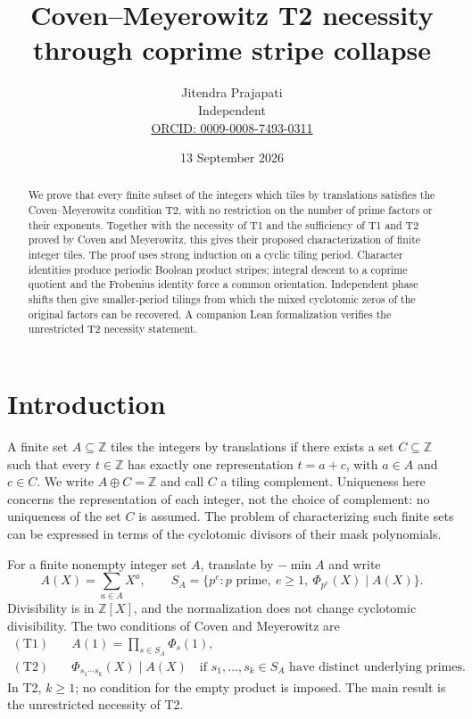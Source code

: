 \documentclass[11pt]{article}
\title{Coven--Meyerowitz T2 necessity\\through coprime stripe collapse}
\author{Jitendra Prajapati\\\small Independent\\\small\href{https://orcid.org/0009-0008-7493-0311}{ORCID: 0009-0008-7493-0311}}
\date{13 September 2026}
\newcommand{\Z}{\mathbb Z}
\newcommand{\PhiC}{\Phi}
\begin{document}
\maketitle
\begin{abstract}
We prove that every finite subset of the integers which tiles by translations satisfies the Coven--Meyerowitz condition T2, with no restriction on the number of prime factors or their exponents. Together with the necessity of T1 and the sufficiency of T1 and T2 proved by Coven and Meyerowitz, this gives their proposed characterization of finite integer tiles. The proof uses strong induction on a cyclic tiling period. Character identities produce periodic Boolean product stripes; integral descent to a coprime quotient and the Frobenius identity force a common orientation. Independent phase shifts then give smaller-period tilings from which the mixed cyclotomic zeros of the original factors can be recovered. A companion Lean formalization verifies the unrestricted T2 necessity statement.
\end{abstract}

\section{Introduction}
A finite set $A\subseteq\Z$ tiles the integers by translations if there exists a set $C\subseteq\Z$ such that every $t\in\Z$ has exactly one representation $t=a+c$, with $a\in A$ and $c\in C$. We write $A\oplus C=\Z$ and call $C$ a tiling complement. Uniqueness here concerns the representation of each integer, not the choice of complement: no uniqueness of the set $C$ is assumed. The problem of characterizing such finite sets can be expressed in terms of the cyclotomic divisors of their mask polynomials.

For a finite nonempty integer set $A$, translate by $-\min A$ and write
\[
 A(X)=\sum_{a\in A}X^a,\qquad
 S_A=\{p^e:p\text{ prime},\ e\ge1,\ \PhiC_{p^e}(X)\mid A(X)\}.
\]
Divisibility is in $\Z[X]$, and the normalization does not change cyclotomic divisibility. The two conditions of Coven and Meyerowitz are
\begin{align*}
 \mathrm{(T1)}\quad & A(1)=\prod_{s\in S_A}\PhiC_s(1),\\
 \mathrm{(T2)}\quad & \PhiC_{s_1\cdots s_k}(X)\mid A(X)
 \quad\text{if }s_1,\ldots,s_k\in S_A\text{ have distinct underlying primes}.
\end{align*}
In T2, $k\ge1$; no condition for the empty product is imposed. The main result is the unrestricted necessity of T2.
\end{document}
